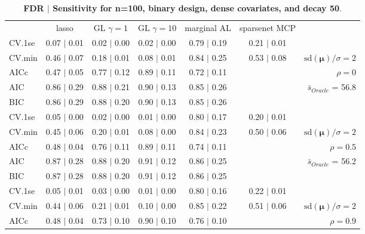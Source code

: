 \clearpage
\begin{table}\vspace{-.5cm}
\caption[l]{ {\it }
{ \bf FDR $\boldsymbol{\mid}$ Sensitivity for n=100, binary design, dense covariates, and  decay  50}.}
\vspace{-.5cm}
\footnotesize{}
\begin{center}
\begin{tabular}{l*{5}{c}|r}
 & lasso & GL $\gamma=1$ & GL $\gamma=10$ & marginal AL & sparsenet MCP  & \\
 \cline{1-7}
CV.1se & 0.07 $\mid$ 0.01 & 0.02 $\mid$ 0.00 & 0.02 $\mid$ 0.00 & 0.79 $\mid$ 0.19 & 0.21 $\mid$ 0.01 & \\
CV.min & 0.46 $\mid$ 0.07 & 0.18 $\mid$ 0.01 & 0.08 $\mid$ 0.01 & 0.84 $\mid$ 0.25 & 0.53 $\mid$ 0.08 &  $\mathrm{sd}(\mathbf{\mu})/\sigma=2$ \\
AICc & 0.47 $\mid$ 0.05 & 0.77 $\mid$ 0.12 & 0.89 $\mid$ 0.11 & 0.72 $\mid$ 0.11 & & $\rho=0$ \\
AIC & 0.86 $\mid$ 0.29 & 0.88 $\mid$ 0.21 & 0.90 $\mid$ 0.13 & 0.85 $\mid$ 0.26 & &  \multirow{2}{*}{$\bar{s}_{Oracle}$ = 56.8} \\
BIC & 0.86 $\mid$ 0.29 & 0.88 $\mid$ 0.20 & 0.90 $\mid$ 0.13 & 0.85 $\mid$ 0.26 & &  \\
 \hline 
CV.1se & 0.05 $\mid$ 0.00 & 0.02 $\mid$ 0.00 & 0.01 $\mid$ 0.00 & 0.80 $\mid$ 0.17 & 0.20 $\mid$ 0.01 & \\
CV.min & 0.45 $\mid$ 0.06 & 0.20 $\mid$ 0.01 & 0.08 $\mid$ 0.00 & 0.84 $\mid$ 0.23 & 0.50 $\mid$ 0.06 &  $\mathrm{sd}(\mathbf{\mu})/\sigma=2$ \\
AICc & 0.48 $\mid$ 0.04 & 0.76 $\mid$ 0.11 & 0.89 $\mid$ 0.11 & 0.74 $\mid$ 0.11 & & $\rho=0.5$ \\
AIC & 0.87 $\mid$ 0.28 & 0.88 $\mid$ 0.20 & 0.91 $\mid$ 0.12 & 0.86 $\mid$ 0.25 & &  \multirow{2}{*}{$\bar{s}_{Oracle}$ = 56.2} \\
BIC & 0.87 $\mid$ 0.28 & 0.88 $\mid$ 0.20 & 0.91 $\mid$ 0.12 & 0.86 $\mid$ 0.25 & &  \\
 \hline 
CV.1se & 0.05 $\mid$ 0.01 & 0.03 $\mid$ 0.00 & 0.01 $\mid$ 0.00 & 0.80 $\mid$ 0.16 & 0.22 $\mid$ 0.01 & \\
CV.min & 0.44 $\mid$ 0.06 & 0.21 $\mid$ 0.01 & 0.10 $\mid$ 0.00 & 0.85 $\mid$ 0.22 & 0.51 $\mid$ 0.06 &  $\mathrm{sd}(\mathbf{\mu})/\sigma=2$ \\
AICc & 0.48 $\mid$ 0.04 & 0.73 $\mid$ 0.10 & 0.90 $\mid$ 0.10 & 0.76 $\mid$ 0.10 & & $\rho=0.9$ \\

\end{tabular}
\end{center}
\end{table}

